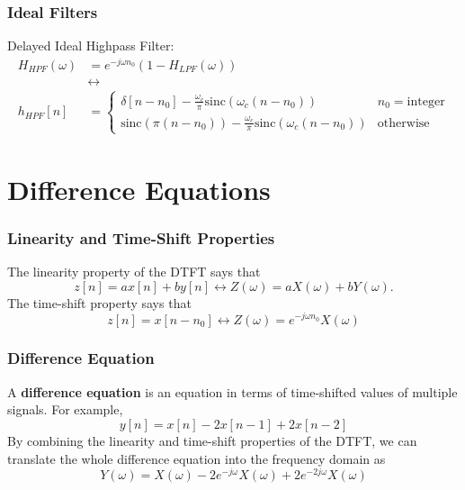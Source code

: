 \documentclass{beamer}
\begin{document}
\begin{frame}
  \frametitle{Ideal Filters}
  Delayed Ideal Highpass Filter:
  \begin{align*}
    H_{HPF}(\omega)&=e^{-j\omega n_0}\left(1-H_{LPF}(\omega)\right)\\
    &\leftrightarrow\\
    h_{HPF}[n]&=\begin{cases}
    \delta[n-n_0]-\frac{\omega_c}{\pi}\mbox{sinc}(\omega_c (n-n_0)) & n_0=\mbox{integer}\\
    \mbox{sinc}(\pi (n-n_0))-\frac{\omega_c}{\pi}\mbox{sinc}(\omega_c (n-n_0)) & \mbox{otherwise}
    \end{cases}
  \end{align*}
\end{frame}

\section{Difference Equations}
\setcounter{subsection}{1}

\begin{frame}
  \frametitle{Linearity and Time-Shift Properties}

  The linearity property of the DTFT says that
  \[
  z[n]= ax[n]+by[n]\leftrightarrow Z(\omega) = aX(\omega)+bY(\omega).
  \]
  The time-shift property says that
  \[
  z[n]= x[n-n_0] \leftrightarrow Z(\omega) = e^{-j\omega n_0} X(\omega)
  \]
\end{frame}

\begin{frame}
  \frametitle{Difference Equation}

  A {\bf difference equation} is an equation in terms of time-shifted
  values of multiple signals.  For example,
  \[
  y[n] = x[n] - 2x[n-1] + 2x[n-2]
  \]
  By combining the linearity and time-shift properties of the DTFT, we
  can translate the whole difference equation into the frequency
  domain as
  \[
  Y(\omega)  = X(\omega) -2e^{-j\omega} X(\omega) + 2 e^{-2j\omega}X(\omega)
  \]
\end{frame}
\end{document}
